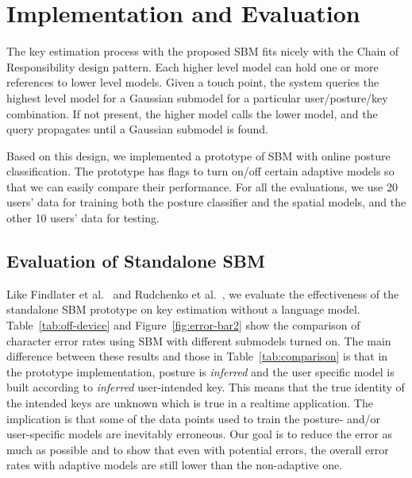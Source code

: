 \documentclass{sigchi}
\begin{document}
\section{Implementation and Evaluation}
The key estimation process with the proposed SBM fits nicely with the
Chain of Responsibility design pattern. Each higher level model can
hold one or more references to lower level models. Given a touch
point, the system queries the highest level model for a Gaussian
submodel for a particular user/posture/key combination. If not present, 
the higher model calls the lower model, and the
query propagates until a Gaussian submodel is found. 

Based on this design, we implemented a prototype of SBM with online posture 
classification. The prototype has flags to turn on/off certain adaptive
 models so that we can easily compare their performance. 
 For all the evaluations, we use 20 users' data for training both the posture classifier 
 and the spatial models, and the other 10 users' data for testing. 

\subsection{Evaluation of Standalone SBM}
Like Findlater et al.~\cite{Findlater:2012} and Rudchenko et al.~\cite{Rudchenko:2011}, we evaluate the effectiveness of the standalone SBM  prototype on key estimation without a language model. 
Table~\ref{tab:off-device} and Figure~\ref{fig:error-bar2} show the comparison of
character error rates using SBM with different submodels turned on. The main
difference between these results and those in Table~\ref{tab:comparison} is that
in the prototype implementation,  posture is \textit{inferred} and the user 
specific model is built according to \textit{inferred} user-intended key. This
means that the true identity of the intended keys are unknown which is true
in a realtime application. The implication is that some of the data points used
to train the posture- and/or user-specific models are inevitably erroneous. Our
goal is to reduce the error as much as possible and to show that even with
potential errors, the overall error rates with adaptive models are still  lower
than the non-adaptive one.
\end{document}
